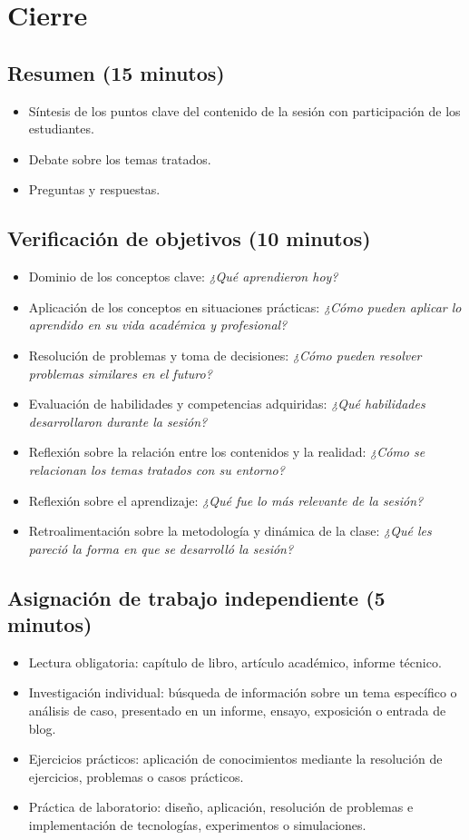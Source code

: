 \section{Cierre}

\subsection*{Resumen (15 minutos)}
\begin{itemize}
    \item Síntesis de los puntos clave del contenido de la sesión con participación de los estudiantes.
    \item Debate sobre los temas tratados.
    \item Preguntas y respuestas.
\end{itemize}

\subsection*{Verificación de objetivos (10 minutos)}
\begin{itemize}
    \item Dominio de los conceptos clave: \textit{¿Qué aprendieron hoy?}
    \item Aplicación de los conceptos en situaciones prácticas: \textit{¿Cómo pueden aplicar lo aprendido en su vida académica y profesional?}
    \item Resolución de problemas y toma de decisiones: \textit{¿Cómo pueden resolver problemas similares en el futuro?}
    \item Evaluación de habilidades y competencias adquiridas: \textit{¿Qué habilidades desarrollaron durante la sesión?}
    \item Reflexión sobre la relación entre los contenidos y la realidad: \textit{¿Cómo se relacionan los temas tratados con su entorno?}
    \item Reflexión sobre el aprendizaje: \textit{¿Qué fue lo más relevante de la sesión?}
    \item Retroalimentación sobre la metodología y dinámica de la clase: \textit{¿Qué les pareció la forma en que se desarrolló la sesión?}
\end{itemize}

\subsection*{Asignación de trabajo independiente (5 minutos)}
\begin{itemize}
    \item Lectura obligatoria: capítulo de libro, artículo académico, informe técnico.
    \item Investigación individual: búsqueda de información sobre un tema específico o análisis de caso, presentado en un informe, ensayo, exposición o entrada de blog.
    \item Ejercicios prácticos: aplicación de conocimientos mediante la resolución de ejercicios, problemas o casos prácticos.
    \item Práctica de laboratorio: diseño, aplicación, resolución de problemas e implementación de tecnologías, experimentos o simulaciones.
\end{itemize}